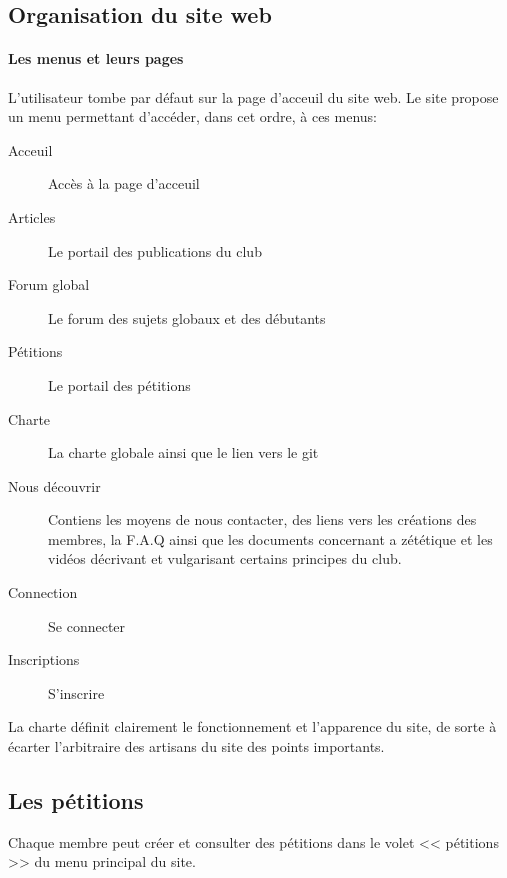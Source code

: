 \documentclass[a4paper,12pt]{article}
\begin{document}
\subsection{Organisation du site web}
\paragraph{Les menus et leurs pages}
L'utilisateur tombe par défaut sur la page d'acceuil du site web. Le site propose un menu permettant d'accéder, dans cet ordre, à ces menus:
\begin{description}
 \item [Acceuil] Accès à la page d'acceuil
 \item [Articles] Le portail des publications du club
 \item [Forum global] Le forum des sujets globaux et des débutants
 \item [Pétitions] Le portail des pétitions
 \item [Charte] La charte globale ainsi que le lien vers le git
 \item [Nous découvrir] Contiens les moyens de nous contacter, des liens vers les créations des membres, la F.A.Q ainsi que les documents concernant a zététique et les vidéos décrivant et vulgarisant certains principes du club.
 \item [Connection] Se connecter
 \item [Inscriptions] S'inscrire
\end{description}


La charte définit clairement le fonctionnement et l'apparence du site, de sorte à écarter l'arbitraire des artisans du site des points importants.
\subsection{Les pétitions}
Chaque membre peut créer et consulter des pétitions dans le volet << pétitions >> du menu principal du site.
\end{document}
